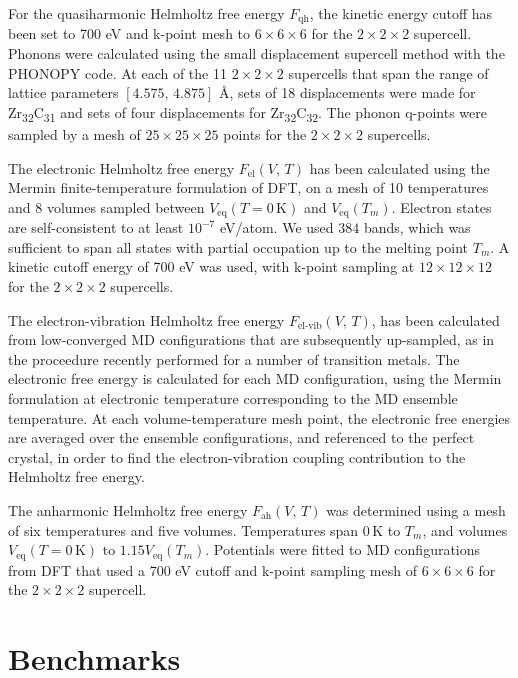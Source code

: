 \documentclass[twocolumn,american,aps,prb,showpacs,showkeys,amsmath,amssymb,superscriptaddress,a4]{revtex4-1}
\begin{document}
For the quasiharmonic Helmholtz free energy $F_{\text{qh}}$, the kinetic energy cutoff has been set to 700
eV and k-point mesh to $6\times6\times6$ for the $2\times2\times2$
supercell. 
Phonons were calculated using the small displacement supercell
method with the \textsc{\footnotesize{}PHONOPY} code.\cite{Togo2015a}
At each of the 11 $2\times2\times2$ supercells that span the range of lattice parameters $[4.575,\,4.875]$ \AA, 
sets of 18 displacements
were made for Zr\textsubscript{32}C\textsubscript{31} and sets of
four displacements for Zr\textsubscript{32}C\textsubscript{32}\@.
The phonon q-points were sampled by a mesh of $25\times25\times25$
points for the $2\times2\times2$ supercells.

The electronic Helmholtz free energy $F_{\text{el}}(V,\,T)$ has been
calculated using the Mermin finite-temperature formulation of DFT,\cite{Mermin1965}
on a mesh of 10 temperatures and 8 volumes sampled between $V_{\text{eq}}(T=0\,\text{K})$
and $V_{\text{eq}}(T_{m})$. Electron states are self-consistent to
at least $10^{-7}$ eV/atom. We used $384$ bands, which was sufficient
to span all states with partial occupation up to the melting point $T_{m}$.
A kinetic cutoff energy of 700 eV was used, with k-point sampling
at $12\times12\times12$ for the $2\times2\times2$ supercells. 

The electron-vibration Helmholtz free energy $F_{\text{el-vib}}(V,\,T)$, has been calculated from low-converged MD configurations that are subsequently up-sampled, as in the proceedure recently performed for a number of transition metals.\cite{Zhang2017} The electronic free energy is calculated for each MD configuration, using the Mermin formulation at electronic temperature corresponding to the MD ensemble temperature. At each volume-temperature mesh point, the electronic free energies are averaged over the ensemble configurations, and referenced to the perfect crystal, in order to find the electron-vibration coupling contribution to the Helmholtz free energy.

The anharmonic Helmholtz free energy $F_{\text{ah}}(V,\,T)$ was determined
using a mesh of six temperatures and five volumes. Temperatures span
$0\,$K to $T_{m}$, and volumes $V_{\text{eq}}(T=0\,\text{K})$ to $1.15V_{\text{eq}}(T_{m})$.
Potentials were fitted to MD configurations from DFT that used a 700
eV cutoff and k-point sampling mesh of $6\times6\times6$ for the
$2\times2\times2$ supercell.

\clearpage{}

\section{Benchmarks \label{sec: BenchMarks} }
\end{document}
